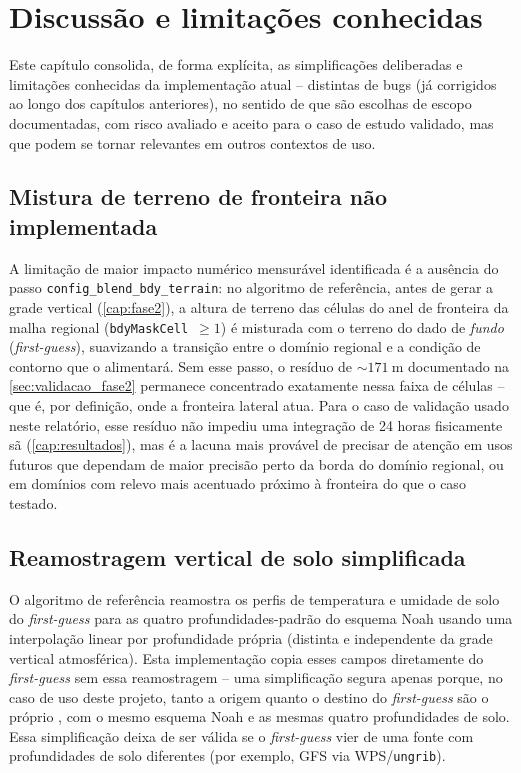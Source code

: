 \chapter{Discussão e limitações conhecidas}
\label{cap:discussao}

Este capítulo consolida, de forma explícita, as simplificações
deliberadas e limitações conhecidas da implementação atual -- distintas
de bugs (já corrigidos ao longo dos capítulos anteriores), no sentido de
que são escolhas de escopo documentadas, com risco avaliado e aceito
para o caso de estudo validado, mas que podem se tornar relevantes em
outros contextos de uso.

\section{Mistura de terreno de fronteira não implementada}
\label{sec:blend_bdy_terrain}

A limitação de maior impacto numérico mensurável identificada é a
ausência do passo \texttt{config\_blend\_bdy\_terrain}: no algoritmo de
referência, antes de gerar a grade vertical (\cref{cap:fase2}), a altura
de terreno das células do anel de fronteira da malha regional
(\texttt{bdyMaskCell}~$\ge 1$) é misturada com o terreno do dado de
\textit{fundo} (\textit{first-guess}), suavizando a transição entre o
domínio regional e a condição de contorno que o alimentará. Sem esse
passo, o resíduo de $\sim\SI{171}{\metre}$ documentado na
\cref{sec:validacao_fase2} permanece concentrado exatamente nessa faixa
de células -- que é, por definição, onde a fronteira lateral atua. Para
o caso de validação usado neste relatório, esse resíduo não impediu uma
integração de 24 horas fisicamente sã (\cref{cap:resultados}), mas é a
lacuna mais provável de precisar de atenção em usos futuros que dependam
de maior precisão perto da borda do domínio regional, ou em domínios com
relevo mais acentuado próximo à fronteira do que o caso testado.

\section{Reamostragem vertical de solo simplificada}

O algoritmo de referência reamostra os perfis de temperatura e umidade
de solo do \textit{first-guess} para as quatro profundidades-padrão do
esquema Noah usando uma interpolação linear por profundidade própria
(distinta e independente da grade vertical atmosférica). Esta
implementação copia esses campos diretamente do \textit{first-guess}
sem essa reamostragem -- uma simplificação segura apenas porque, no caso
de uso deste projeto, tanto a origem quanto o destino do
\textit{first-guess} são o próprio \mpasa{}, com o mesmo esquema Noah e
as mesmas quatro profundidades de solo. Essa simplificação deixa de ser
válida se o \textit{first-guess} vier de uma fonte com profundidades de
solo diferentes (por exemplo, GFS via WPS/\texttt{ungrib}).

